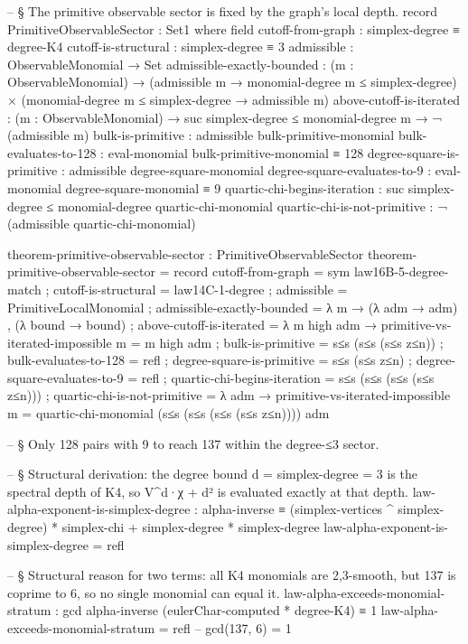 \documentclass[11pt,a4paper]{book}
\begin{document}
\begin{code}
-- § The primitive observable sector is fixed by the graph's local depth.
record PrimitiveObservableSector : Set1 where
  field
    cutoff-from-graph : simplex-degree ≡ degree-K4
    cutoff-is-structural : simplex-degree ≡ 3
    admissible : ObservableMonomial → Set
    admissible-exactly-bounded :
      (m : ObservableMonomial) →
      (admissible m → monomial-degree m ≤ simplex-degree)
      × (monomial-degree m ≤ simplex-degree → admissible m)
    above-cutoff-is-iterated :
      (m : ObservableMonomial) →
      suc simplex-degree ≤ monomial-degree m →
      ¬ (admissible m)
    bulk-is-primitive : admissible bulk-primitive-monomial
    bulk-evaluates-to-128 : eval-monomial bulk-primitive-monomial ≡ 128
    degree-square-is-primitive : admissible degree-square-monomial
    degree-square-evaluates-to-9 : eval-monomial degree-square-monomial ≡ 9
    quartic-chi-begins-iteration :
      suc simplex-degree ≤ monomial-degree quartic-chi-monomial
    quartic-chi-is-not-primitive : ¬ (admissible quartic-chi-monomial)

theorem-primitive-observable-sector : PrimitiveObservableSector
theorem-primitive-observable-sector = record
  { cutoff-from-graph = sym law16B-5-degree-match
  ; cutoff-is-structural = law14C-1-degree
  ; admissible = PrimitiveLocalMonomial
    ; admissible-exactly-bounded = λ m → (λ adm → adm) , (λ bound → bound)
  ; above-cutoff-is-iterated =
      λ m high adm → primitive-vs-iterated-impossible {m = m} high adm
  ; bulk-is-primitive = s≤s (s≤s (s≤s z≤n))
  ; bulk-evaluates-to-128 = refl
  ; degree-square-is-primitive = s≤s (s≤s z≤n)
  ; degree-square-evaluates-to-9 = refl
  ; quartic-chi-begins-iteration = s≤s (s≤s (s≤s (s≤s z≤n)))
  ; quartic-chi-is-not-primitive =
      λ adm →
        primitive-vs-iterated-impossible {m = quartic-chi-monomial}
          (s≤s (s≤s (s≤s (s≤s z≤n))))
          adm
  }

-- § Only 128 pairs with 9 to reach 137 within the degree-≤3 sector.

-- § Structural derivation: the degree bound d = simplex-degree = 3 is the spectral depth of K4, so V^d·χ + d² is evaluated exactly at that depth.
law-alpha-exponent-is-simplex-degree :
  alpha-inverse ≡   (simplex-vertices ^ simplex-degree) * simplex-chi
                  + simplex-degree * simplex-degree
law-alpha-exponent-is-simplex-degree = refl

-- § Structural reason for two terms: all K4 monomials are {2,3}-smooth, but 137 is coprime to 6, so no single monomial can equal it.
law-alpha-exceeds-monomial-stratum :
  gcd alpha-inverse (eulerChar-computed * degree-K4) ≡ 1
law-alpha-exceeds-monomial-stratum = refl  -- gcd(137, 6) = 1


\end{code}
\end{document}
